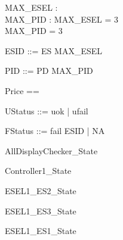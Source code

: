 \documentclass{article}
\begin{document}

\begin{axdef}
	MAX\_ESEL : \nat \\
 MAX\_PID : \nat 
\where
 MAX\_ESEL = 3 \\
 MAX\_PID = 3
\end{axdef}

\begin{zed}
	ESID ::= ES  \upto MAX\_ESEL \rdata
\end{zed}

\begin{zed}
	PID ::= PD  \upto MAX\_PID \rdata
\end{zed}

\begin{zed}
	Price == \nat
\end{zed}

\begin{zed}
	UStatus ::= uok | ufail
\end{zed}

\begin{zed}
	FStatus ::= fail \ldata ESID \rdata | NA
\end{zed}

\begin{zed}
	AllDisplayChecker\_State 
\end{zed}

\begin{zed}
	Controller1\_State 
\end{zed}

\begin{zed}
	ESEL1\_ES2\_State 
\end{zed}

\begin{zed}
	ESEL1\_ES3\_State 
\end{zed}

\begin{zed}
	ESEL1\_ES1\_State 
\end{zed}
\end{document}
